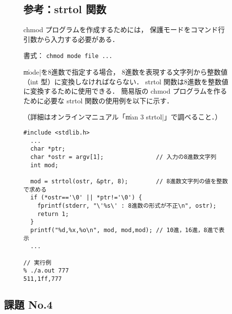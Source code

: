 \begin{figure}
\begin{framed}
\subsection*{参考：strtol 関数}
chmod プログラムを作成するためには，
保護モードをコマンド行引数から入力する必要がある．

\centerline{書式： \texttt{chmod mode file ...}}

\|mode|を8進数で指定する場合，
8進数を表現する文字列から整数値（int 型）に変換しなければならない．
strtol 関数は8進数を整数値に変換するために使用できる．
簡易版の chmod プログラムを作るために必要な
strtol 関数の使用例を以下に示す．

（詳細はオンラインマニュアル「\|man 3 strtol|」で調べること．）

\begin{lstlisting}[numbers=none, frame=none]
#include <stdlib.h>
  ...
  char *ptr;
  char *ostr = argv[1];               // 入力の8進数文字列
  int mod;

  mod = strtol(ostr, &ptr, 8);        // 8進数文字列の値を整数で求める
  if (*ostr=='\0' || *ptr!='\0') {
    fprintf(stderr, "\'%s\' : 8進数の形式が不正\n", ostr);
    return 1;
  }
  printf("%d,%x,%o\n", mod, mod,mod); // 10進，16進，8進で表示
  ...

// 実行例
% ./a.out 777
511,1ff,777
\end{lstlisting}
\end{framed}
\end{figure}

\subsection*{課題 No.4}

